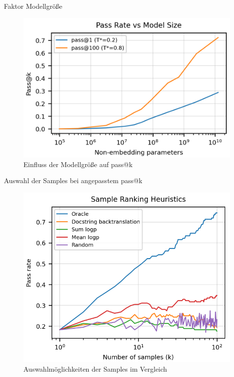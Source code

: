 \documentclass{beamer}              %
\begin{document}
\begin{frame}{Faktor Modellgröße}
    \begin{figure}
        \centering
        \includegraphics[width=0.7\paperwidth]{images/passkvssize.png}
        \caption{Einfluss der Modellgröße auf pass@k\cite{chen2021evaluating}}
    \end{figure}
\end{frame}

\begin{frame}{Auswahl der Samples bei angepasstem pass@k}
    \begin{figure}
        \centering
        \includegraphics[width=0.55\paperwidth]{images/heuristcs.png}
        \caption{Auswahlmöglichkeiten der Samples im Vergleich\cite{chen2021evaluating}}
    \end{figure}
\end{frame}
\end{document}
